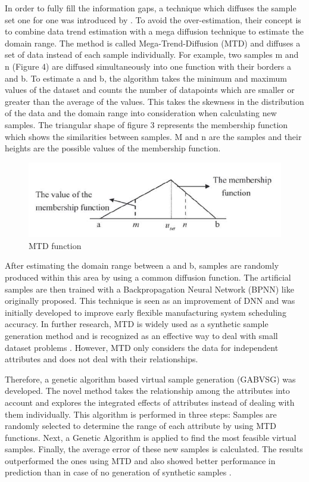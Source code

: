 \documentclass[parskip=full]{scrartcl}
\begin{document}
In order to fully fill the information gaps, a technique which diffuses the sample set one for one was introduced by \cite{Li.2007}. To avoid the over-estimation, their concept is to combine data trend estimation with a mega diffusion technique to estimate the domain range. The method is called Mega-Trend-Diffusion (MTD) and diffuses a set of data instead of each sample individually. For example, two samples m and n (Figure 4) are diffused simultaneously into one function with their borders a and b. To estimate a and b, the algorithm takes the minimum and maximum values of the dataset and counts the number of datapoints which are smaller or greater than the average of the values. This takes the skewness in the distribution of the data and the domain range into consideration when calculating new samples. The triangular shape of figure 3 represents the membership function which shows the similarities between samples. M and n are the samples and their heights are the possible values of the membership function.

\begin{figure}[h]
	\centering
	\includegraphics[width=0.7\linewidth]{"MTD function"}
	\caption{MTD function}
	\label{fig:mtd-function}
\end{figure}

After estimating the domain range between a and b, samples are randomly produced within this area by using a common diffusion function. The artificial samples are then trained with a Backpropagation Neural Network (BPNN) like \cite{Huang.2004} originally proposed. This technique is seen as an improvement of DNN and was initially developed to improve early flexible manufacturing system scheduling accuracy. In further research, MTD is widely used as a synthetic sample generation method and is recognized as an effective way to deal with small dataset problems \cite{AbdulLateh.2017}. However, MTD only considers the data for independent attributes and does not deal with their relationships. 

Therefore, a genetic algorithm based virtual sample generation (GABVSG) was developed. The novel method takes the relationship among the attributes into account and explores the integrated effects of attributes instead of dealing with them individually. This algorithm is performed in three steps: Samples are randomly selected to determine the range of each attribute by using MTD functions. Next, a Genetic Algorithm is applied to find the most feasible virtual samples. Finally, the average error of these new samples is calculated. The results outperformed the ones using MTD and also showed better performance in prediction than in case of no generation of synthetic samples \cite{Li.2014}.
\end{document}
